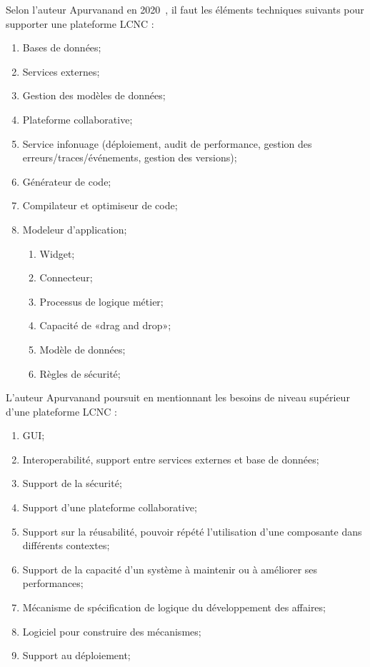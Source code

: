 Selon l'auteur Apurvanand en 2020~\cite{9226356}, il faut les éléments techniques suivants pour supporter une plateforme LCNC :
\begin{enumerate}
    \item Bases de données;
    \item Services externes;
    \item Gestion des modèles de données;
    \item Plateforme collaborative;
    \item Service infonuage (déploiement, audit de performance, gestion des erreurs/traces/événements, gestion des versions);
    \item Générateur de code;
    \item Compilateur et optimiseur de code;
    \item Modeleur d’application;
    \begin{enumerate}
        \item Widget;
        \item Connecteur;
        \item Processus de logique métier;
        \item Capacité de «drag and drop»;
        \item Modèle de données;
        \item Règles de sécurité;
    \end{enumerate}
\end{enumerate}

L'auteur Apurvanand poursuit en mentionnant les besoins de niveau supérieur d’une plateforme LCNC :
\begin{enumerate}
    \item GUI;
    \item Interoperabilité, support entre services externes et base de données;
    \item Support de la sécurité;
    \item Support d’une plateforme collaborative;
    \item Support sur la réusabilité, pouvoir répété l’utilisation d’une composante dans différents contextes;
    \item Support de la capacité d’un système à maintenir ou à améliorer ses performances;
    \item Mécanisme de spécification de logique du développement des affaires;
    \item Logiciel pour construire des mécanismes;
    \item Support au déploiement;
\end{enumerate}

